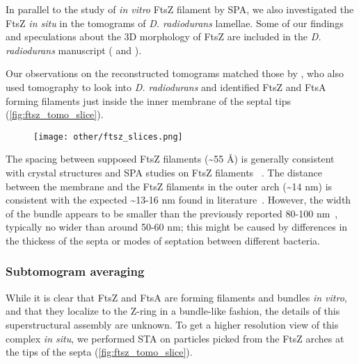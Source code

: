 In parallel to the study of \textit{in vitro} FtsZ filament by SPA, we also investigated the FtsZ \textit{in situ} in the tomograms of \textit{D. radiodurans} lamellae.
Some of our findings and speculations about the 3D morphology of FtsZ are included in the \textit{D. radiodurans} manuscript ( and ).

Our observations on the reconstructed tomograms matched those by \citet{sextonSuperresolutionConfocalCryoCLEM2022}, who also used tomography to look into \textit{D. radiodurans} and identified FtsZ and FtsA forming filaments just inside the inner membrane of the septal tips (\autoref{fig:ftsz_tomo_slice}). %

\begin{figure}[ht]
    \centering
    \texttt{[image: other/ftsz\_slices.png]}
    \label{fig:ftsz_tomo_slice}
\end{figure}

The spacing between supposed FtsZ filaments (\sim55 Å) is generally consistent with crystal structures and SPA studies on FtsZ filaments ~\cite{mcquillenInsightsStructureFunction2020}.
The distance between the membrane and the FtsZ filaments in the outer arch (\sim14 nm) is consistent with the expected \sim13-16 nm found in literature~\cite{mcquillenInsightsStructureFunction2020}.
However, the width of the bundle appears to be smaller than the previously reported 80-100 nm~\cite{mcquillenInsightsStructureFunction2020}, typically no wider than around 50-60 nm; this might be caused by differences in the thickess of the septa or modes of septation between different bacteria.

\subsubsection{Subtomogram averaging}

While it is clear that FtsZ and FtsA are forming filaments and bundles \textit{in vitro}, and that they localize to the Z-ring in a bundle-like fashion, the details of this superstructural assembly are unknown.
To get a higher resolution view of this complex \textit{in situ}, we performed STA on particles picked from the FtsZ arches at the tips of the septa (\autoref{fig:ftsz_tomo_slice}).

